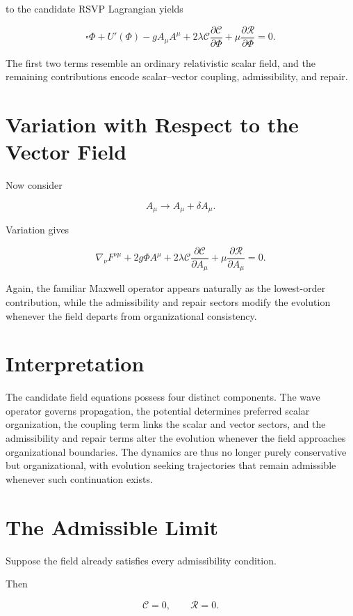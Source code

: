 \documentclass[11pt,oneside]{book}
\numberwithin{equation}{chapter}
\theoremstyle{definition}
\theoremstyle{plain}
\begin{document}
to the candidate RSVP Lagrangian yields

\[
\boxed{
\square\Phi
+
U'(\Phi)
-
gA_\mu A^\mu
+
2\lambda
\mathcal C
\frac{\partial\mathcal C}{\partial\Phi}
+
\mu
\frac{\partial\mathcal R}{\partial\Phi}
=
0.
}
\]

The first two terms resemble an ordinary relativistic scalar field, and the remaining contributions encode scalar--vector coupling, admissibility, and repair.

\section{Variation with Respect to the Vector Field}

Now consider

\[
A_\mu
\rightarrow
A_\mu+\delta A_\mu.
\]

Variation gives

\[
\nabla_\nu
F^{\nu\mu}
+
2g\Phi A^\mu
+
2\lambda
\mathcal C
\frac{\partial\mathcal C}{\partial A_\mu}
+
\mu
\frac{\partial\mathcal R}
{\partial A_\mu}
=
0.
\]

Again, the familiar Maxwell operator appears naturally as the lowest-order
contribution, while the admissibility and repair sectors modify the
evolution whenever the field departs from organizational consistency.

\section{Interpretation}

The candidate field equations possess four distinct components. The wave operator governs propagation, the potential determines preferred scalar organization, the coupling term links the scalar and vector sectors, and the admissibility and repair terms alter the evolution whenever the field approaches organizational boundaries. The dynamics are thus no longer purely conservative but organizational, with evolution seeking trajectories that remain admissible whenever such continuation exists.

\section{The Admissible Limit}

Suppose the field already satisfies every admissibility condition.

Then

\[
\mathcal C=0,
\qquad
\mathcal R=0.
\]
\end{document}
